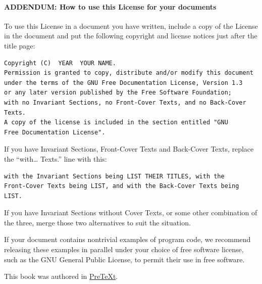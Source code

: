 \documentclass[10pt,]{book}
\theoremstyle{plain}
\theoremstyle{definition}
\theoremstyle{definition}
\theoremstyle{definition}
\theoremstyle{definition}
\numberwithin{equation}{section}
\begin{document}
\paragraph[{ADDENDUM: How to use this License for your documents}]{ADDENDUM: How to use this License for your documents}\hypertarget{gfdl-addendum}{}
To use this License in a document you have written, include a copy of the License in the document and put the following copyright and license notices just after the title page:%
\begin{verbatim}
Copyright (C)  YEAR  YOUR NAME.
Permission is granted to copy, distribute and/or modify this document
under the terms of the GNU Free Documentation License, Version 1.3
or any later version published by the Free Software Foundation;
with no Invariant Sections, no Front-Cover Texts, and no Back-Cover Texts.
A copy of the license is included in the section entitled "GNU
Free Documentation License".
\end{verbatim}
\par
If you have Invariant Sections, Front-Cover Texts and Back-Cover Texts, replace the ``with\dots{} Texts.'' line with this:%
\begin{verbatim}
with the Invariant Sections being LIST THEIR TITLES, with the
Front-Cover Texts being LIST, and with the Back-Cover Texts being LIST.
\end{verbatim}
\par
If you have Invariant Sections without Cover Texts, or some other combination of the three, merge those two alternatives to suit the situation.%
\par
If your document contains nontrivial examples of program code, we recommend releasing these examples in parallel under your choice of free software license, such as the GNU General Public License, to permit their use in free software.%
%
\backmatter
%
\cleardoublepage
\pagestyle{empty}
\centerline{This book was authored in \href{http://mathbook.pugetsound.edu}{PreTeXt}.%
}
\end{document}
